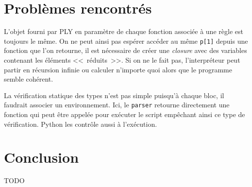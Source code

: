 \documentclass[12pt,twocolumn]{article}
\begin{document}
\section{Problèmes rencontrés}
L'objet fourni par PLY en paramètre de chaque fonction
associée à une règle est toujours le même. On ne peut ainsi
pas espérer accéder au même \texttt{p[1]} depuis une fonction
que l'on retourne, il est nécessaire de créer une \textit{closure}
avec des variables contenant les éléments <<~réduits~>>.
Si on ne le fait pas, l'interpréteur peut partir en récursion infinie
ou calculer n'importe quoi alors que le programme semble cohérent.

La vérification statique des types n'est pas simple puisqu'à chaque bloc,
il faudrait associer un environnement. Ici, le \texttt{parser} retourne
directement une fonction qui peut être appelée pour exécuter le script
empêchant ainsi ce type de vérification.
Python les contrôle aussi à l'exécution.


\section{Conclusion}
TODO


%
\end{document}
